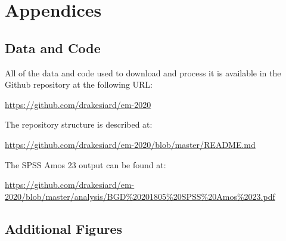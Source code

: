 \documentclass[11pt,a4paper]{article}
\begin{document}
\clearpage

\section{Appendices}

\subsection{Data and Code}\label{sec:data_and_code}

All of the data and code used to download and process it is available in the Github repository at the following URL:

\url{https://github.com/drakesiard/em-2020}

\noindent
The repository structure is described at:

\url{https://github.com/drakesiard/em-2020/blob/master/README.md}

\noindent
The SPSS Amos 23 output can be found at:

\begin{adjustbox}{max width=\textwidth}
\url{https://github.com/drakesiard/em-2020/blob/master/analysis/BGD\%20201805\%20SPSS\%20Amos\%2023.pdf}
\end{adjustbox}

\subsection{Additional Figures}\label{sec:graph_appendix}
\end{document}

